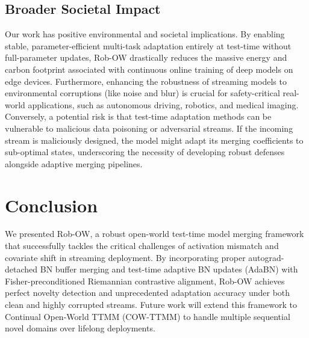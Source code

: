\documentclass{article}
\begin{document}
\subsection{Broader Societal Impact}
Our work has positive environmental and societal implications. By enabling stable, parameter-efficient multi-task adaptation entirely at test-time without full-parameter updates, Rob-OW drastically reduces the massive energy and carbon footprint associated with continuous online training of deep models on edge devices. Furthermore, enhancing the robustness of streaming models to environmental corruptions (like noise and blur) is crucial for safety-critical real-world applications, such as autonomous driving, robotics, and medical imaging. Conversely, a potential risk is that test-time adaptation methods can be vulnerable to malicious data poisoning or adversarial streams. If the incoming stream is maliciously designed, the model might adapt its merging coefficients to sub-optimal states, underscoring the necessity of developing robust defenses alongside adaptive merging pipelines.

\section{Conclusion}
\label{sec:conclusion}
We presented Rob-OW, a robust open-world test-time model merging framework that successfully tackles the critical challenges of activation mismatch and covariate shift in streaming deployment. By incorporating proper autograd-detached BN buffer merging and test-time adaptive BN updates (AdaBN) with Fisher-preconditioned Riemannian contrastive alignment, Rob-OW achieves perfect novelty detection and unprecedented adaptation accuracy under both clean and highly corrupted streams. Future work will extend this framework to Continual Open-World TTMM (COW-TTMM) to handle multiple sequential novel domains over lifelong deployments.



\end{document}
